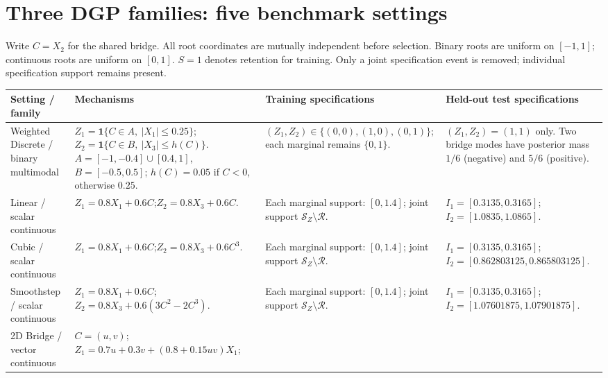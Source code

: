 \documentclass[11pt]{article}
\newcommand{\ind}{\mathbf{1}}
\newcommand{\R}{\mathcal{R}}
\begin{document}
\section*{Three DGP families: five benchmark settings}
Write $C=X_2$ for the shared bridge. All root coordinates are mutually independent before selection. Binary roots are uniform on $[-1,1]$; continuous roots are uniform on $[0,1]$. $S=1$ denotes retention for training. Only a joint specification event is removed; individual specification support remains present.

\begin{table}[h!]
\centering\small
\renewcommand{\arraystretch}{1.45}
\begin{tabular}{p{24mm}p{90mm}p{41mm}p{77mm}}
\toprule
Setting / family & Mechanisms & Training specifications & Held-out test specifications \\
\midrule
Weighted Discrete / binary multimodal &
$Z_1=\ind\{C\in A,\ |X_1|\leq0.25\}$;\newline
$Z_2=\ind\{C\in B,\ |X_3|\leq h(C)\}$.\newline
$A=[-1,-0.4]\cup[0.4,1]$, $B=[-0.5,0.5]$; $h(C)=0.05$ if $C<0$, otherwise $0.25$. &
$(Z_1,Z_2)\in\{(0,0),(1,0),(0,1)\}$; each marginal remains $\{0,1\}$. & $(Z_1,Z_2)=(1,1)$ only. Two bridge modes have posterior mass $1/6$ (negative) and $5/6$ (positive). \\
\midrule
Linear / scalar continuous & $Z_1=0.8X_1+0.6C$;\newline $Z_2=0.8X_3+0.6C$. & Each marginal support: $[0,1.4]$; joint support $\mathcal S_Z\setminus\R$. & $I_1=[0.3135,0.3165]$;\newline $I_2=[1.0835,1.0865]$. \\
Cubic / scalar continuous & $Z_1=0.8X_1+0.6C$;\newline $Z_2=0.8X_3+0.6C^3$. & Each marginal support: $[0,1.4]$; joint support $\mathcal S_Z\setminus\R$. & $I_1=[0.3135,0.3165]$;\newline $I_2=[0.862803125,0.865803125]$. \\
Smoothstep / scalar continuous & $Z_1=0.8X_1+0.6C$;\newline $Z_2=0.8X_3+0.6(3C^2-2C^3)$. & Each marginal support: $[0,1.4]$; joint support $\mathcal S_Z\setminus\R$. & $I_1=[0.3135,0.3165]$;\newline $I_2=[1.07601875,1.07901875]$. \\
\midrule
2D Bridge / vector continuous &
$C=(u,v)$;\newline
$Z_1=0.7u+0.3v+(0.8+0.15uv)X_1$;\newline

\end{tabular}
\end{table}
\end{document}
